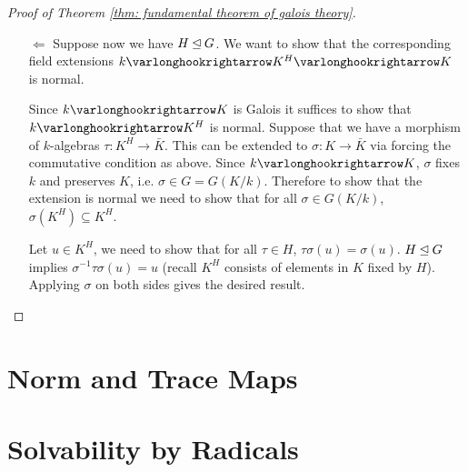 \documentclass{article}
\begin{document}
\begin{proof}[Proof of Theorem \ref{thm: fundamental theorem of galois theory}]
\begin{enumerate}[label=\arabic*)]
\begin{itemize}
            \vspace{1em}
            \begin{minipage}{\linewidth}
                \centering
            \end{minipage}
            \vspace{1em}

            Since the extension $k \ext K$ is also normal, and we have the natural extension $K \ext \bar{L}$, apply again \hyperref[def: normal extension]{3) of normal extensions} $\bar{\tau}(K) \subseteq K$, which gives a pre-image for any automorphism in $G(L/k)$. Apply the first isomorphism theorem gives $G/H \simeq G(L/k)$.
            \item[$\Leftarrow$] Suppose now we have $H \unlhd G$. We want to show that the corresponding field extensions $k \ext K^H \ext K$ is normal.
            
            Since $k \ext K$ is Galois it suffices to show that $k \ext K^H$ is normal. Suppose that we have a morphism of $k$-algebras $\tau: K^H \to \bar{K}$. This can be extended to $\sigma: K \to \bar{K}$ via forcing the commutative condition as above. Since $k \ext K$, $\sigma$ fixes $k$ and preserves $K$, i.e. $\sigma \in G = G(K/k)$. Therefore to show that the extension is normal we need to show that for all $\sigma \in G(K/k)$, $\sigma(K^H) \subseteq K^H$. 

            Let $u \in K^H$, we need to show that for all $\tau \in H$, $\tau \sigma(u) = \sigma(u)$. $H \unlhd G$ implies $\sigma^{-1} \tau \sigma(u) = u$ (recall $K^H$ consists of elements in $K$ fixed by $H$). Applying $\sigma$ on both sides gives the desired result. 
        \end{itemize}
    \end{enumerate}
\end{proof}

\section{Norm and Trace Maps}

\section{Solvability by Radicals}
\end{document}
